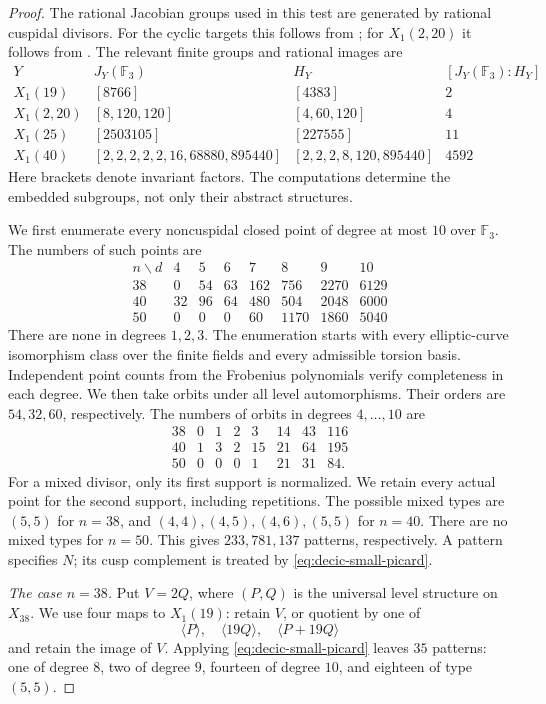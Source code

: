 \begin{proof}
The rational Jacobian groups used in this test are generated by
rational cuspidal divisors. For the cyclic targets this follows from
\cite[Theorem~4.13 and Corollary~4.14]{DEHMZ}; for $X_1(2,20)$ it
follows from \cite[Proposition~4.16 and Table~3]{DEHMZ}.
The relevant finite groups and rational images are
\[
\begin{array}{c|c|c|r}
 Y&J_Y(\mathbb F_3)&H_Y&[J_Y(\mathbb F_3):H_Y]\\\hline
 X_1(19)&[8766]&[4383]&2\\
 X_1(2,20)&[8,120,120]&[4,60,120]&4\\
 X_1(25)&[2503105]&[227555]&11\\
 X_1(40)&[2,2,2,2,2,16,68880,895440]
          &[2,2,2,8,120,895440]&4592
\end{array}
\]
Here brackets denote invariant factors. The computations determine the
embedded subgroups, not only their abstract structures.

We first enumerate every noncuspidal closed point of degree at most
$10$ over $\mathbb F_3$. The numbers of such points are
\[
\begin{array}{c|rrrrrrr}
 n\backslash d&4&5&6&7&8&9&10\\\hline
 38&0&54&63&162&756&2270&6129\\
 40&32&96&64&480&504&2048&6000\\
 50&0&0&0&60&1170&1860&5040
\end{array}
\]
There are none in degrees $1,2,3$. The enumeration starts with every
elliptic-curve isomorphism class over the finite fields and every
admissible torsion basis. Independent point counts from the Frobenius
polynomials verify completeness in each degree. We then take orbits
under all level automorphisms. Their orders are $54,32,60$,
respectively. The numbers of orbits in degrees $4,\ldots,10$ are
\[
\begin{array}{c|rrrrrrr}
38&0&1&2&3&14&43&116\\
40&1&3&2&15&21&64&195\\
50&0&0&0&1&21&31&84.
\end{array}
\]
For a mixed divisor, only its first support is normalized. We retain
every actual point for the second support, including repetitions.
The possible mixed types are $(5,5)$ for $n=38$, and
$(4,4),(4,5),(4,6),(5,5)$ for $n=40$. There are no mixed types for
$n=50$. This gives $233,781,137$ patterns, respectively. A pattern
specifies $N$; its cusp complement is treated by
\eqref{eq:decic-small-picard}.

\medskip\noindent
\emph{The case $n=38$.}
Put $V=2Q$, where $(P,Q)$ is the universal level structure on $X_{38}$.
We use four maps to $X_1(19)$: retain $V$, or quotient by one of
\[
 \langle P\rangle,\quad\langle19Q\rangle,
 \quad\langle P+19Q\rangle
\]
and retain the image of $V$. Applying
\eqref{eq:decic-small-picard} leaves $35$ patterns: one of degree $8$,
two of degree $9$, fourteen of degree $10$, and eighteen of type $(5,5)$.


\end{proof}
